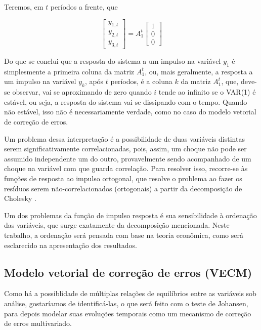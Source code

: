 \documentclass[a4paper,
               article,
               12pt,
               openany,
               oneside,
               english,
               brazil]{abntex2}
\numberwithin{equation}{section}
\begin{document}
    Teremos, em $ t $ períodos a frente, que

    \begin{equation*}
        \begin{bmatrix}
            y_{1,t} \\
            y_{2,t} \\
            y_{3,t}
        \end{bmatrix} =
        A_1^{t}
        \begin{bmatrix}
            1 \\
            0 \\
            0
        \end{bmatrix}
    \end{equation*}

    Do que se conclui que a resposta do sistema a um impulso na variável $ y_1 $ é simplesmente a primeira coluna da matriz $ A_1^{t} $, ou, mais geralmente, a resposta a um impulso na variável $ y_k $, após $ t $ períodos, é a coluna $ k $ da matriz $ A_1^{t} $, que, deve-se observar, vai se aproximando de zero quando $ i $ tende ao infinito se o VAR(1) é estável, ou seja, a resposta do sistema vai se dissipando com o tempo. Quando não estável, isso não é necessariamente verdade, como no caso do modelo vetorial de correção de erros.

   Um problema dessa interpretação é a possibilidade de duas variáveis distintas serem significativamente correlacionadas, pois, assim, um choque não pode ser assumido independente um do outro, provavelmente sendo acompanhado de um choque na variável com que guarda correlação. Para resolver isso, recorre-se às funções de resposta ao impulso ortogonal, que resolve o problema ao fazer os resíduos serem não-correlacionados (ortogonais) a partir da decomposição de Cholesky \cite[56-62]{lutkepool}.

   Um dos problemas da função de impulso resposta é sua sensibilidade à ordenação das variáveis, que surge exatamente da decomposição mencionada. Neste trabalho, a ordenação será pensada com base na teoria econômica, como será esclarecido na apresentação dos resultados.

    \subsection{Modelo vetorial de correção de erros (VECM)}

    Como há a possiblidade de múltiplas relações de equilíbrios entre as variáveis sob análise, gostaríamos de identificá-las, o que será feito com o teste de Johansen, para depois modelar suas evoluções temporais como um mecanismo de correção de erros multivariado.
\end{document}
